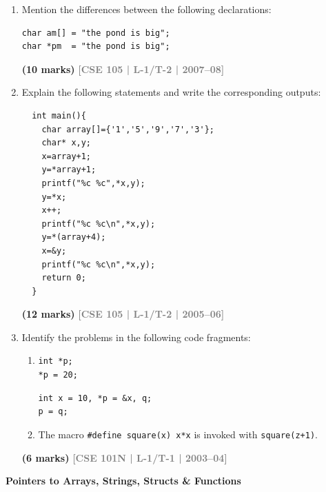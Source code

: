 \documentclass[12pt,a3paper]{article}
\newcommand{\yr}[1]{\hfill\textcolor{gray}{\small\textbf{[#1]}}}
\newcommand{\mk}[1]{\textcolor{orange!70!black}{\small\textbf{(#1 marks)}}}
\newcommand{\subtopic}[2]{%
  \vspace{10pt}
  \noindent\begin{tcolorbox}[colback=#1!8,colframe=#1,boxrule=0.6pt,arc=4pt,
    left=6pt,right=6pt,top=4pt,bottom=4pt]
    \small\bfseries\textcolor{#1}{#2}
  \end{tcolorbox}
  \vspace{2pt}
}
\begin{document}
\begin{enumerate}
\begin{lstlisting}
char *p = "ctrl", *q = "alt", c, d;
c = *++p;
d = ++*q;
printf("%c %s\n%c %s", c, p, d, q);
\end{lstlisting}
\mk{10} \yr{CSE 101 | L-1/T-2 | 2009--10}

\item Mention the differences between the following declarations:
\begin{lstlisting}
char am[] = "the pond is big";
char *pm  = "the pond is big";
\end{lstlisting}
\mk{10} \yr{CSE 105 | L-1/T-2 | 2007--08}

\item Explain the following statements and write the corresponding outputs:
\begin{lstlisting}
  int main(){
    char array[]={'1','5','9','7','3'};
    char* x,y;
    x=array+1;
    y=*array+1;
    printf("%c %c",*x,y);
    y=*x;
    x++;
    printf("%c %c\n",*x,y);
    y=*(array+4);
    x=&y;
    printf("%c %c\n",*x,y);
    return 0;
  }
\end{lstlisting}
\mk{12} \yr{CSE 105 | L-1/T-2 | 2005--06}

\item Identify the problems in the following code fragments:
 
\begin{enumerate}
  \item
 \begin{lstlisting}
int *p;
*p = 20;
\end{lstlisting}
\begin{lstlisting}
int x = 10, *p = &x, q;
p = q;
\end{lstlisting}
  \item The macro \texttt{\#define square(x) x*x} is invoked with \texttt{square(z+1)}.
\end{enumerate}
\mk{6} \yr{CSE 101N | L-1/T-1 | 2003--04}

\end{enumerate}

\subtopic{cC}{Pointers to Arrays, Strings, Structs \& Functions}
\label{sub:s5-ptradv}
\end{document}
